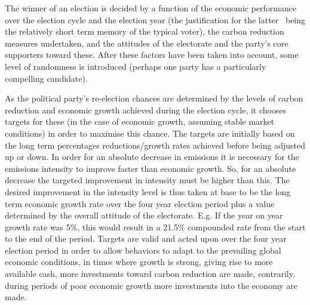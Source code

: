 \documentclass[]{article} %
\begin{document}
The winner of an election is decided by a function of the economic performance over the election cycle and the election year (the justification for the latter  being the relatively short term memory of the typical voter), the carbon reduction measures undertaken, and the attitudes of the electorate and the party’s core supporters toward these. After these factors have been taken into account, some level of randomness is introduced (perhaps one party has a particularly compelling candidate).

As the political party’s re-election chances are determined by the levels of carbon reduction and economic growth achieved during the election cycle, it chooses targets for these (in the case of economic growth, assuming stable market conditions) in order to maximise this chance. The targets are initially based on the long term percentages reductions/growth rates achieved before being adjusted up or down. In order for an absolute decrease in emissions it is necessary for the emissions intensity to improve faster than economic growth. So, for an absolute decrease the targeted improvement in intensity must be higher than this. The desired improvement in the intensity level is thus taken at base to be the long term economic growth rate over the four year election period plus a value determined by the overall attitude of the electorate. E.g. If the year on year growth rate was 5\%, this would result in a 21.5\% compounded rate from the start to the end of the period. Targets are valid and acted upon over the four year election period in order to allow behaviors to adapt to the prevailing global economic conditions, in times where growth is strong, giving rise to more available cash, more investments toward carbon reduction are made, contrarily, during periods of poor economic growth more investments into the economy are made. 
\end{document}
